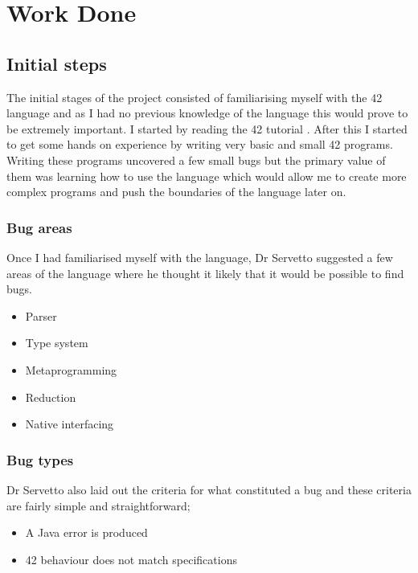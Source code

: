 \chapter{Work Done}\label{C:workdone}

\section{Initial steps}

The initial stages of the project consisted of familiarising myself with the 42 language and as I had no previous knowledge of the language this would prove to be extremely important. I started by reading the 42 tutorial \cite{L42}. After this I started to get some hands on experience by writing very basic and small 42 programs. Writing these programs uncovered a few small bugs but the primary value of them was learning how to use the language which would allow me to create more complex programs and push the boundaries of the language later on. 

\subsection{Bug areas}
Once I had familiarised myself with the language, Dr Servetto suggested a few areas of the language where he thought it likely that it would be possible to find bugs.
\begin{itemize}
	\item{Parser}
	\item{Type system}
	\item{Metaprogramming}
	\item{Reduction}
	\item{Native interfacing}
\end{itemize}
\subsection{Bug types}
Dr Servetto also laid out the criteria for what constituted a bug and these criteria are fairly simple and straightforward;
\begin{itemize}
	\item{A Java error is produced}
	\item{42 behaviour does not match specifications}
\end{itemize}
